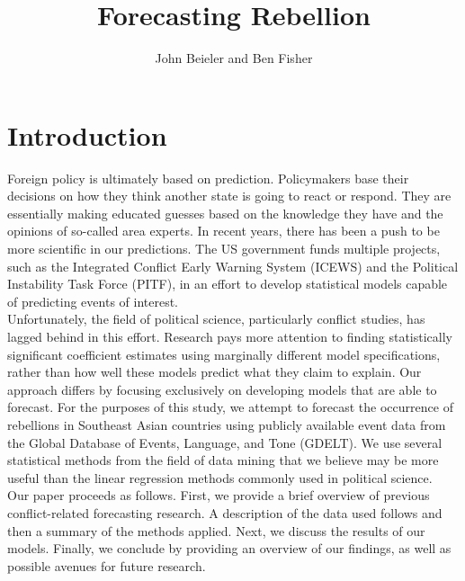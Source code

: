 \documentclass[12pt, letterpaper]{article}
\title{Forecasting Rebellion}
\author{John Beieler and Ben Fisher}
\begin{document}
 
\maketitle 

\newpage
\doublespacing
\section*{Introduction}
Foreign policy is ultimately based on prediction. Policymakers base their decisions on how they think another state is going to react or respond. They are essentially making educated guesses based on the knowledge they have and the opinions of so-called area experts. In recent years, there has been a push to be more scientific in our predictions. The US government funds multiple projects, such as the Integrated Conflict Early Warning System (ICEWS) and the Political Instability Task Force (PITF), in an effort to develop statistical models capable of predicting events of interest. \\

\indent Unfortunately, the field of political science, particularly conflict studies, has lagged behind in this effort. Research pays more attention to finding statistically significant coefficient estimates using marginally different model specifications, rather than how well these models predict what they claim to explain. Our approach differs by focusing exclusively on developing models that are able to forecast. For the purposes of this study, we attempt to forecast the occurrence of rebellions in Southeast Asian countries using publicly available event data from the Global Database of Events, Language, and Tone (GDELT). We use several statistical methods from the field of data mining that we believe may be more useful than the linear regression methods commonly used in political science. \\

\indent Our paper proceeds as follows. First, we provide a brief overview of previous conflict-related forecasting research. A description of the data used follows and then a summary of the methods applied. Next, we discuss the results of our models. Finally, we conclude by providing an overview of our findings, as well as possible avenues for future research.\\
\end{document}
